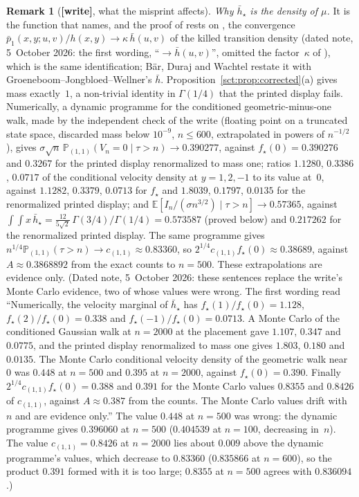 \documentclass[11pt,letterpaper]{article}
\theoremstyle{definition}\newtheorem{remark}[theorem]{Remark}
\newcommand{\Pp}{\mathbb P}\newcommand{\Ee}{\mathbb E}
\newcommand{\hstar}{\bar h_\star}\newcommand{\fstar}{f_\star}\newcommand{\Kstar}{K_\star}
\newcommand{\wtag}{\textup{\textbf{[write]}}}
\begin{document}
\begin{remark}[\wtag, what the misprint affects]
\emph{Why $\hstar$ is the density of $\mu$.} It is the function that \cite[Remark~2]{dw} names, and the proof of \cite[(8)]{dw} rests on \cite[Lemma~16]{dw}, the convergence $\bar p_1(x,y;u,v)/h(x,y)\to\kappa\,\bar h(u,v)$ of the killed transition density (dated note, 5~October 2026: the first wording, ``$\to\bar h(u,v)$'', omitted the factor~$\kappa$ of \cite[Lemma~16, p.~186]{dw}), which is the same identification; Bär, Duraj and Wachtel \cite[Propositions~3--4, Corollary~5]{bdw} restate it with Groeneboom--Jongbloed--Wellner's $\bar h$. Proposition~\ref{sct:prop:corrected}(a) gives mass exactly~$1$, a non-trivial identity in $\Gamma(1/4)$ that the printed display fails. Numerically, a dynamic programme for the conditioned geometric-minus-one walk, made by the independent check of the write (floating point on a truncated state space, discarded mass below $10^{-9}$, $n\le600$, extrapolated in powers of $n^{-1/2}$), gives $\sigma\sqrt n\,\Pp_{(1,1)}(V_n=0\mid\tau>n)\to0.390277$, against $\fstar(0)=0.390276$ and $0.3267$ for the printed display renormalized to mass one; ratios $1.1280$, $0.3386$, $0.0717$ of the conditional velocity density at $y=1,2,-1$ to its value at~$0$, against $1.1282$, $0.3379$, $0.0713$ for $\fstar$ and $1.8039$, $0.1797$, $0.0135$ for the renormalized printed display; and $\Ee[I_n/(\sigma n^{3/2})\mid\tau>n]\to0.57365$, against $\int\!\!\int x\,\hstar=\frac{12}{5\sqrt2}\,\Gamma(3/4)/\Gamma(1/4)=0.573587$ (proved below) and $0.217262$ for the renormalized printed display. The same programme gives $n^{1/4}\Pp_{(1,1)}(\tau>n)\to c_{(1,1)}\approx0.83360$, so $2^{1/4}c_{(1,1)}\fstar(0)\approx0.38689$, against $A\approx0.3868892$ from the exact counts to $n=500$. These extrapolations are evidence only. (Dated note, 5~October 2026: these sentences replace the write's Monte Carlo evidence, two of whose values were wrong. The first wording read ``Numerically, the velocity marginal of $\hstar$ has $\fstar(1)/\fstar(0)=1.128$, $\fstar(2)/\fstar(0)=0.338$ and $\fstar(-1)/\fstar(0)=0.0713$. A Monte Carlo of the conditioned Gaussian walk at $n=2000$ at the placement gave $1.107$, $0.347$ and $0.0775$, and the printed display renormalized to mass one gives $1.803$, $0.180$ and $0.0135$. The Monte Carlo conditional velocity density of the geometric walk near~$0$ was $0.448$ at $n=500$ and $0.395$ at $n=2000$, against $\fstar(0)=0.390$. Finally $2^{1/4}c_{(1,1)}\fstar(0)=0.388$ and $0.391$ for the Monte Carlo values $0.8355$ and $0.8426$ of $c_{(1,1)}$, against $A\approx0.387$ from the counts. The Monte Carlo values drift with $n$ and are evidence only.'' The value $0.448$ at $n=500$ was wrong: the dynamic programme gives $0.396060$ at $n=500$ ($0.404539$ at $n=100$, decreasing in~$n$). The value $c_{(1,1)}=0.8426$ at $n=2000$ lies about $0.009$ above the dynamic programme's values, which decrease to $0.83360$ ($0.835866$ at $n=600$), so the product $0.391$ formed with it is too large; $0.8355$ at $n=500$ agrees with $0.836094$.)


\end{remark}
\end{document}
